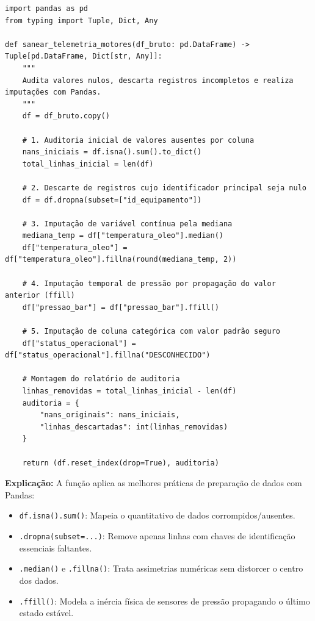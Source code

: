 \ifmostrarGabarito
\begin{verbatim}
import pandas as pd
from typing import Tuple, Dict, Any

def sanear_telemetria_motores(df_bruto: pd.DataFrame) -> Tuple[pd.DataFrame, Dict[str, Any]]:
    """
    Audita valores nulos, descarta registros incompletos e realiza imputações com Pandas.
    """
    df = df_bruto.copy()
    
    # 1. Auditoria inicial de valores ausentes por coluna
    nans_iniciais = df.isna().sum().to_dict()
    total_linhas_inicial = len(df)
    
    # 2. Descarte de registros cujo identificador principal seja nulo
    df = df.dropna(subset=["id_equipamento"])
    
    # 3. Imputação de variável contínua pela mediana
    mediana_temp = df["temperatura_oleo"].median()
    df["temperatura_oleo"] = df["temperatura_oleo"].fillna(round(mediana_temp, 2))
    
    # 4. Imputação temporal de pressão por propagação do valor anterior (ffill)
    df["pressao_bar"] = df["pressao_bar"].ffill()
    
    # 5. Imputação de coluna categórica com valor padrão seguro
    df["status_operacional"] = df["status_operacional"].fillna("DESCONHECIDO")
    
    # Montagem do relatório de auditoria
    linhas_removidas = total_linhas_inicial - len(df)
    auditoria = {
        "nans_originais": nans_iniciais,
        "linhas_descartadas": int(linhas_removidas)
    }
    
    return (df.reset_index(drop=True), auditoria)
\end{verbatim}

\textbf{Explicação:}
A função aplica as melhores práticas de preparação de dados com Pandas:
\begin{itemize}[leftmargin=*]
    \item \texttt{df.isna().sum()}: Mapeia o quantitativo de dados corrompidos/ausentes.
    \item \texttt{.dropna(subset=...)}: Remove apenas linhas com chaves de identificação essenciais faltantes.
    \item \texttt{.median()} e \texttt{.fillna()}: Trata assimetrias numéricas sem distorcer o centro dos dados.
    \item \texttt{.ffill()}: Modela a inércia física de sensores de pressão propagando o último estado estável.
\end{itemize}
\fi
